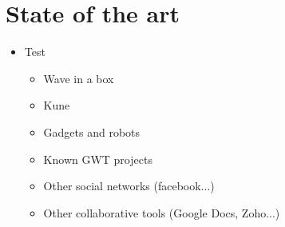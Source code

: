 \newpage
\section{State of the art}

\begin{itemize}
  \item Test
  \begin{itemize}
    \item Wave in a box
    \item Kune
    \item Gadgets and robots
    \item Known GWT projects
    \item Other social networks (facebook...)
    \item Other collaborative tools (Google Docs, Zoho...)
  \end{itemize}
  
\end{itemize}
